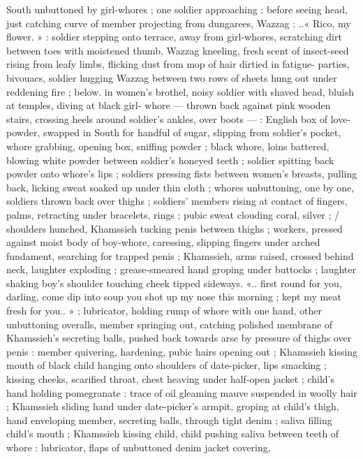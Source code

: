 South unbuttoned by girl-whores ; one soldier approaching : before
seeing head, just catching curve of member projecting from
dungarees, Wazzag : ..« Rico, my flower. » : soldier stepping onto
terrace, away from girl-whores, scratching dirt between toes with
moistened thumb, Wazzag kneeling, fresh scent of insect-seed rising
from leafy limbs, flicking dust from mop of hair dirtied in fatigue-
parties, bivouacs, soldier hugging Wazzag between two rows of
sheets hung out under reddening fire ; below. in women's brothel, %
noisy soldier with shaved head, bluish at temples, diving at black girl-
whore --- thrown back against pink wooden stairs, crossing heels
around soldier's ankles, over boots --- : English box of love-powder,
swapped in South for handful of sugar, slipping from soldier's
pocket, whore grabbing, opening box, sniffing powder ; black whore,
loins battered, blowing white powder between soldier's honeyed
teeth ; soldier spitting back powder onto whore's lips ; soldiers
pressing fists between women's breasts, pulling back, licking sweat
soaked up under thin cloth ; whores unbuttoning, one by one,
soldiers thrown back over thighs ; soldiers’ members rising at contact
of fingers, palms, retracting under bracelets, rings ; pubic sweat
clouding coral, silver ; / shoulders hunched, Khamssieh tucking penis
between thighs ; workers, pressed against moist body of boy-whore,
caressing, slipping fingers under arched fundament, searching for
trapped penis ; Khamssieh, arms raised, crossed behind neck,
laughter exploding ; grease-smeared hand groping under buttocks ;
laughter shaking boy's shoulder touching cheek tipped sideways. «..
first round for you, darling, come dip into soup you shot up my nose
this morning ; kept my meat fresh for you.. » ; lubricator, holding
rump of whore with one hand, other unbuttoning overalls, member
springing out, catching polished membrane of Khamssieh’s secreting
balls, pushed back towards arse by pressure of thighs over penis :
member quivering, hardening, pubic hairs opening out ; Khamssieh
kissing mouth of black child hanging onto shoulders of date-picker,
lips smacking ; kissing cheeks, scarified throat, chest heaving under
half-open jacket ; child's hand holding pomegranate : trace of oil
gleaming mauve suspended in woolly hair ; Khamssieh sliding hand
under date-picker's armpit, groping at child's thigh, hand enveloping
member, secreting balls, through tight denim ; saliva filling child's
mouth ; Khamssieh kissing child, child pushing saliva between teeth
of whore : lubricator, flaps of unbuttoned denim jacket covering,
